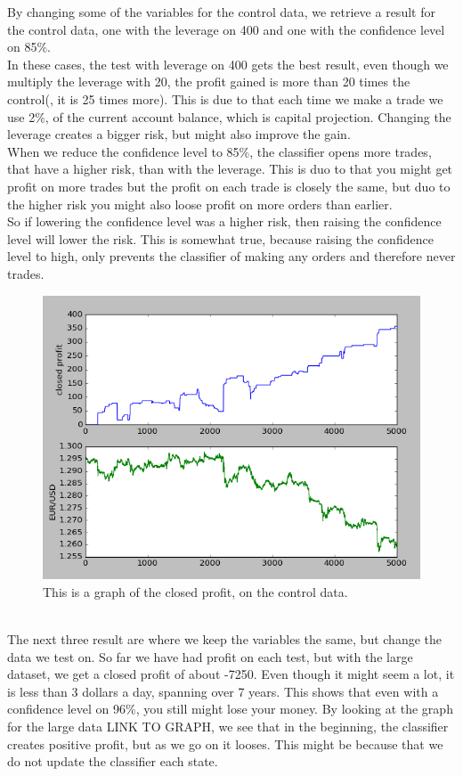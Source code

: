 \documentclass[10pt]{IEEEtran}
\begin{document}
By changing some of the variables for the control data, we retrieve a result for the control data, one with the leverage on 400 and one with the confidence level on 85\%.\\
In these cases, the test with leverage on 400 gets the best result, even though we multiply the leverage with 20, the profit gained is more than 20 times the control(, it is 25 times more). This is due to that each time we make a trade we use 2\%, of the current account balance, which is capital projection. Changing the leverage creates a bigger risk, but might also improve the gain.\\
When we reduce the confidence level to 85\%, the classifier opens more trades, that have a higher risk, than with the leverage. This is duo to that you might get profit on more trades but the profit on each trade is closely the same, but duo to the higher risk you might also loose profit on more orders than earlier.\\
So if lowering the confidence level was a higher risk, then raising the confidence level will lower the risk. This is somewhat true, because raising the confidence level to high, only prevents the classifier of making any orders and therefore never trades.\\  
\begin{figure}[h]
    \includegraphics[scale = 0.5]{data-96-10000-20.png}
    \caption{This is a graph of the closed profit, on the control data.}
\end{figure}
\\
The next three result are where we keep the variables the same, but change the data we test on. So far we have had profit on each test, but with the large dataset, we get a closed profit of about -7250. Even though it might seem a lot, it is less than 3 dollars a day, spanning over 7 years. This shows that even with a confidence level on 96\%, you still might lose your money. By looking at the graph for the large data LINK TO GRAPH, we see that in the beginning, the classifier creates positive profit, but as we go on it looses. This might be because that we do not update the classifier each state.\\
\end{document}
